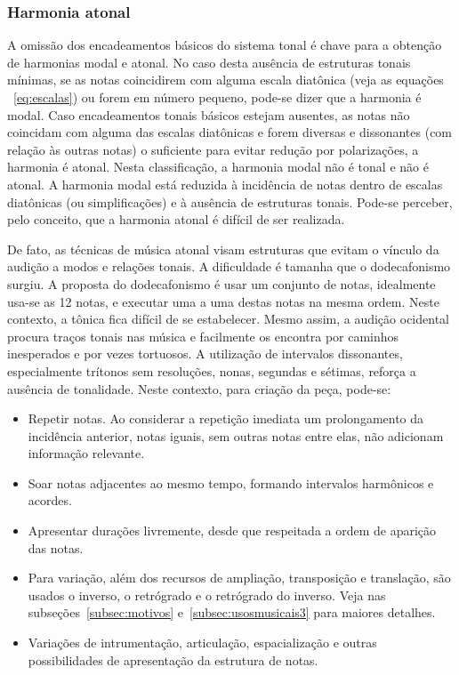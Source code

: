 \subsubsection{Harmonia atonal}
A omissão dos encadeamentos básicos do sistema tonal é chave para a obtenção de 
harmonias modal e atonal. No caso desta ausência de estruturas tonais mínimas,
se as notas coincidirem com alguma escala diatônica (veja as equações ~\ref{eq:escalas})
ou forem em número pequeno, pode-se dizer que a
harmonia é modal. Caso encadeamentos tonais básicos estejam ausentes, as notas não coincidam
com alguma das escalas diatônicas e forem diversas e dissonantes (com relação às outras notas) o suficiente para evitar redução por
polarizações, a harmonia é atonal.
Nesta classificação, a harmonia modal não é tonal e não é atonal.
A harmonia modal está reduzida à incidência de notas dentro de escalas diatônicas (ou simplificações) e à ausência de estruturas tonais.
Pode-se perceber, pelo conceito, que a harmonia atonal é difícil de ser realizada.\cite{harmEXT}

De fato, as técnicas de música atonal
visam estruturas que evitam o vínculo da audição a modos e relações tonais. A
dificuldade é tamanha que o dodecafonismo surgiu. A proposta do dodecafonismo é
usar um conjunto de notas, idealmente usa-se as 12 notas, e executar uma a uma destas notas
na mesma ordem. Neste contexto, a tônica fica difícil de se estabelecer. Mesmo assim, a audição ocidental
procura traços tonais nas música e facilmente os encontra por caminhos inesperados e por vezes tortuosos.
A utilização de
intervalos dissonantes, especialmente trítonos sem resoluções, nonas, segundas e sétimas, reforça
a ausência de tonalidade. Neste contexto, para criação da peça, pode-se:
\begin{itemize}
    \item Repetir notas. Ao considerar a repetição imediata um prolongamento da incidência anterior, notas iguais, sem outras notas entre elas, não adicionam informação relevante.
    \item Soar notas adjacentes ao mesmo tempo, formando intervalos harmônicos e acordes.
    \item Apresentar durações livremente, desde que respeitada a ordem de aparição das notas.
    \item Para variação, além dos recursos de ampliação, transposição e translação, são usados o inverso, o retrógrado e o retrógrado do inverso. Veja nas subseções~\ref{subsec:motivos} e~\ref{subsec:usosmusicais3} para maiores detalhes.
    \item Variações de intrumentação, articulação, espacialização e outras possibilidades de apresentação da estrutura de notas.
\end{itemize}

